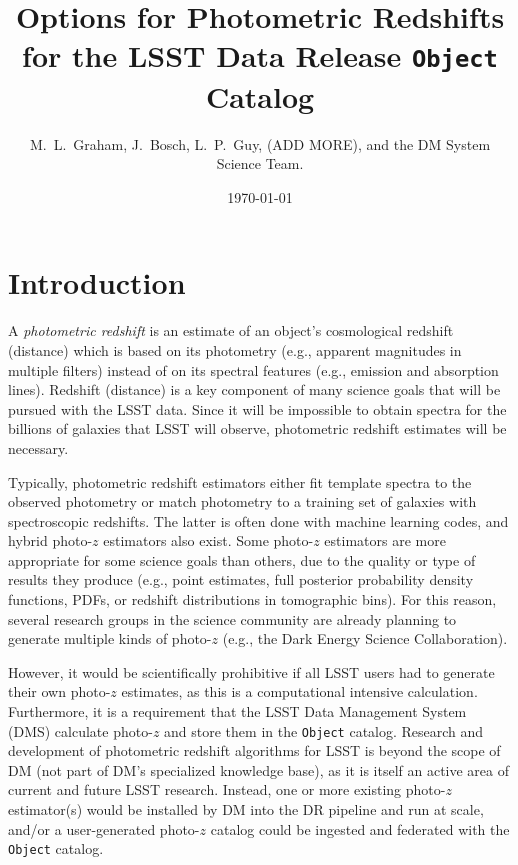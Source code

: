 \documentclass[DM,lsstdraft,toc]{lsstdoc}
\title[Photo-$z$ for LSST Objects]{Options for Photometric Redshifts for the LSST Data Release {\tt Object} Catalog}
\author{M.~L.~Graham, J.~Bosch, L.~P.~Guy, (ADD MORE), and the DM System Science Team.}
\date{\today}
\begin{document}
\maketitle




\section{Introduction} \label{sec:intro}

A {\it photometric redshift} is an estimate of an object's cosmological redshift (distance) which is based on its photometry (e.g., apparent magnitudes in multiple filters) instead of on its spectral features (e.g., emission and absorption lines). 
Redshift (distance) is a key component of many science goals that will be pursued with the LSST data.
Since it will be impossible to obtain spectra for the billions of galaxies that LSST will observe, photometric redshift estimates will be necessary.

Typically, photometric redshift estimators either fit template spectra to the observed photometry or match photometry to a training set of galaxies with spectroscopic redshifts. 
The latter is often done with machine learning codes, and hybrid photo-$z$ estimators also exist. 
Some photo-$z$ estimators are more appropriate for some science goals than others, due to the quality or type of results they produce (e.g., point estimates, full posterior probability density functions, PDFs, or redshift distributions in tomographic bins).
For this reason, several research groups in the science community are already planning to generate multiple kinds of photo-$z$ (e.g., the Dark Energy Science Collaboration).

However, it would be scientifically prohibitive if all LSST users had to generate their own photo-$z$ estimates, as this is a computational intensive calculation.
Furthermore, it is a requirement that the LSST Data Management System (DMS) calculate photo-$z$ and store them in the {\tt Object} catalog.
Research and development of photometric redshift algorithms for LSST is beyond the scope of DM (not part of DM's specialized knowledge base), as it is itself an active area of current and future LSST research.
Instead, one or more existing photo-$z$ estimator(s) would be installed by DM into the DR pipeline and run at scale, and/or a user-generated photo-$z$ catalog could be ingested and federated with the {\tt Object} catalog.
\end{document}
